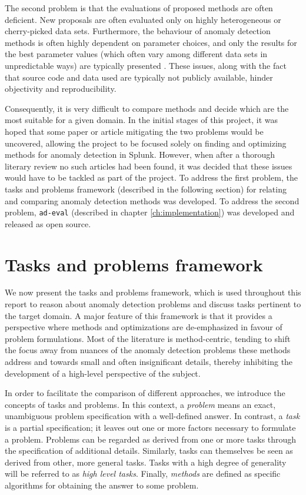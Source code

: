 The second problem is that the evaluations of proposed methods are often deficient. New proposals are often evaluated only on highly heterogeneous or cherry-picked data sets. Furthermore, the behaviour of anomaly detection methods is often highly dependent on parameter choices, and only the results for the best parameter values (which often vary among different data sets in unpredictable ways) are typically presented \cite{keogh5}. These issues, along with the fact that source code and data used are typically not publicly available, hinder objectivity and reproducibility. 

Consequently, it is very difficult to compare methods and decide which are the most suitable for a given domain. In the initial stages of this project, it was hoped that some paper or article mitigating the two problems would be uncovered, allowing the project to be focused solely on finding and optimizing methods for anomaly detection in Splunk. However, when after a thorough literary review no such articles had been found, it was decided that these issues would have to be tackled as part of the project. To address the first problem, the tasks and problems framework (described in the following section) for relating and comparing anomaly detection methods was developed. To address the second problem, \texttt{ad-eval} (described in chapter \ref{ch:implementation}) was developed and released as open source.

\section{Tasks and problems framework}
\label{sect:tasks_problems}

We now present the tasks and problems framework, which is used throughout this report to reason about anomaly detection problems and discuss tasks pertinent to the target domain. A major feature of this framework is that it provides a perspective where methods and optimizations are de-emphasized in favour of problem formulations. Most of the literature is method-centric, tending to shift the focus away from nuances of the anomaly detection problems these methods address and towards small and often insignificant details, thereby inhibiting the development of a high-level perspective of the subject.

In order to facilitate the comparison of different approaches, we introduce the concepts of tasks and problems. In this context, a \emph{problem} means an exact, unambiguous problem specification with a well-defined answer. In contrast, a \emph{task} is a partial specification; it leaves out one or more factors necessary to formulate a problem. Problems can be regarded as derived from one or more tasks through the specification of additional details. Similarly, tasks can themselves be seen as derived from other, more general tasks. Tasks with a high degree of generality will be referred to as \emph{high level tasks}. Finally, \emph{methods} are defined as specific algorithms for obtaining the answer to some problem.

